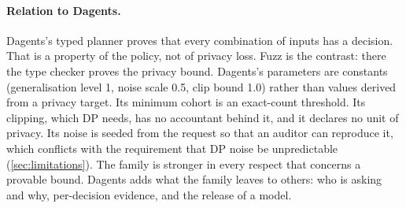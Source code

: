 \paragraph{Relation to Dagents.} Dagents's typed planner proves that every
combination of inputs has a decision. That is a property of the policy, not of
privacy loss. Fuzz is the contrast: there the type checker proves the privacy
bound. Dagents's parameters are constants (generalisation level 1, noise scale
0.5, clip bound 1.0) rather than values derived from a privacy target. Its
minimum cohort is an exact-count threshold. Its clipping, which DP needs, has no
accountant behind it, and it declares no unit of privacy. Its noise is seeded
from the request so that an auditor can reproduce it, which conflicts with the
requirement that DP noise be unpredictable (\cref{sec:limitations}). The family
is stronger in every respect that concerns a provable bound. Dagents adds what
the family leaves to others: who is asking and why, per-decision evidence, and
the release of a model.
